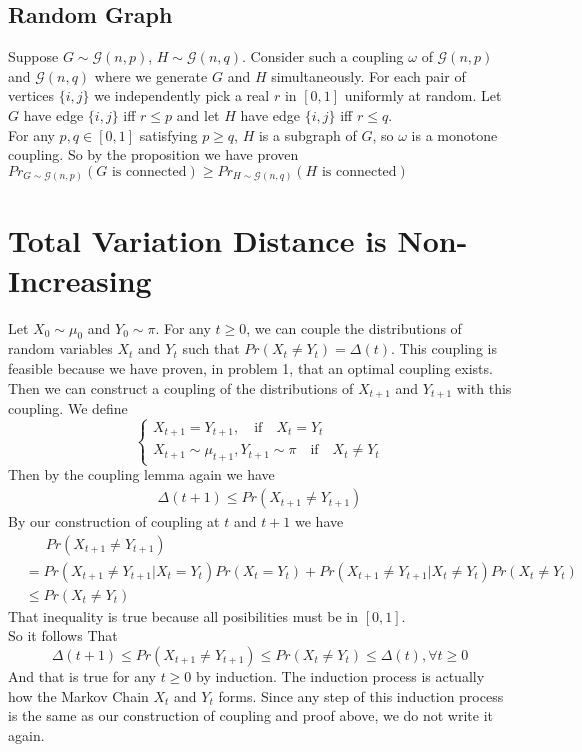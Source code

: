 \documentclass[12pt,letterpaper]{article}
\begin{document}
\subsection{Random Graph}
Suppose $G\sim\mathcal{G}(n,p)$, $H\sim\mathcal{G}(n,q)$. Consider such a coupling $\omega$ of $\mathcal{G}(n,p)$ and $\mathcal{G}(n,q)$ where we generate $G$ and $H$ simultaneously. For each pair of vertices $\{i,j\}$ we independently pick a real $r$ in $[0,1]$ uniformly at random. Let $G$ have edge $\{i,j\}$ iff $r\leq p$ and let $H$ have edge $\{i,j\}$ iff $r\leq q$.\\ 
For any $p,q\in[0,1]$ satisfying $p\geq q$, $H$ is a subgraph of $G$, so $\omega$ is a monotone coupling. So by the proposition we have proven $Pr_{G\sim\mathcal{G}(n,p)}(G\text{ is connected})\geq Pr_{H\sim\mathcal{G}(n,q)}(H\text{ is connected})$

\newpage
\section{Total Variation Distance is Non-Increasing}
Let $X_0\sim\mu_0$ and $Y_0\sim\pi$. For any $t\geq 0$, we can couple the distributions of random variables $X_t$ and $Y_t$ such that $Pr(X_t\neq Y_t)=\Delta(t)$. This coupling is feasible because we have proven, in problem 1, that an optimal coupling exists.\\
Then we can construct a coupling of the distributions of  $X_{t+1}$ and $Y_{t+1}$ with this coupling. We define 
$$\begin{cases}
  X_{t+1}=Y_{t+1},\quad \text{if} \quad X_t=Y_t\\
  X_{t+1}\sim\mu_{t+1}, Y_{t+1}\sim\pi \quad \text{if} \quad X_t\neq Y_t
\end{cases}$$
Then by the coupling lemma again we have 
\begin{align}
  \Delta(t+1)\leq Pr(X_{t+1}\neq Y_{t+1})
\end{align}
By our construction of coupling at $t$ and $t+1$ we have
\begin{align}
  &\quad\enspace  Pr(X_{t+1}\neq Y_{t+1})\\
  &=Pr(X_{t+1}\neq Y_{t+1}|X_t=Y_t)Pr(X_t=Y_t)+Pr(X_{t+1}\neq Y_{t+1}|X_t\neq Y_t)Pr(X_t\neq Y_t)\\
  &\leq Pr(X_t\neq Y_t)
\end{align} 
That inequality is true because all posibilities must be in $[0,1]$.\\
So it follows That
$$\Delta(t+1)\leq Pr(X_{t+1}\neq Y_{t+1})\leq Pr(X_t\neq Y_t)\leq\Delta(t),\forall t\geq 0$$
And that is true for any $t\geq 0$ by induction. The induction process is actually how the Markov Chain $X_t$ and $Y_t$ forms. Since any step of this induction process is the same as our construction of coupling and proof above, we do not write it again.
\end{document}
